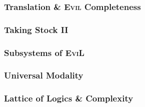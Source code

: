 \subsubsection{Translation \& \textsc{Evil} Completeness}
\label{translation}

% 

\subsubsection{Taking Stock II}\label{taking-stockII}


\subsubsection{Subsystems of \textsc{EviL}}\label{subsystems}


\subsubsection{Universal Modality}\label{supersystems}


\subsubsection{Lattice of Logics \& Complexity}\label{lattice}\label{conservative-extension}





